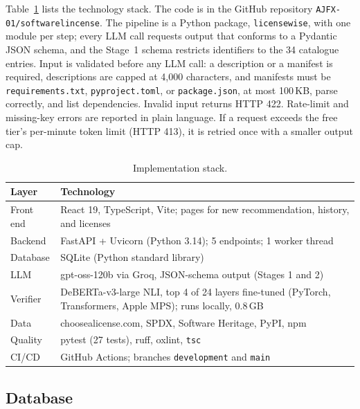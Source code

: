 Table~\ref{tab:impl} lists the technology stack. The code is in the GitHub repository \texttt{AJFX-01/softwarelincense}. The pipeline is a Python package, \texttt{licensewise}, with one module per step; every LLM call requests output that conforms to a Pydantic JSON schema, and the Stage~1 schema restricts identifiers to the 34 catalogue entries. Input is validated before any LLM call: a description or a manifest is required, descriptions are capped at 4{,}000 characters, and manifests must be \texttt{requirements.txt}, \texttt{pyproject.toml}, or \texttt{package.json}, at most 100\,KB, parse correctly, and list dependencies. Invalid input returns HTTP 422. Rate-limit and missing-key errors are reported in plain language. If a request exceeds the free tier's per-minute token limit (HTTP 413), it is retried once with a smaller output cap.

\begin{table}[tb]
    \caption{Implementation stack.}
    \label{tab:impl}
    \centering
    \footnotesize
    \begin{tabularx}{\columnwidth}{@{}lX@{}}
        \toprule
        \textbf{Layer} & \textbf{Technology} \\
        \midrule
        Front end & React 19, TypeScript, Vite; pages for new recommendation, history, and licenses \\
        Backend & FastAPI + Uvicorn (Python 3.14); 5 endpoints; 1 worker thread \\
        Database & SQLite (Python standard library) \\
        LLM & gpt-oss-120b via Groq, JSON-schema output (Stages 1 and 2) \\
        Verifier & DeBERTa-v3-large NLI, top 4 of 24 layers fine-tuned (PyTorch, Transformers, Apple MPS); runs locally, 0.8\,GB \\
        Data & choosealicense.com, SPDX, Software Heritage, PyPI, npm \\
        Quality & pytest (27 tests), ruff, oxlint, \texttt{tsc} \\
        CI/CD & GitHub Actions; branches \texttt{development} and \texttt{main} \\
        \bottomrule
    \end{tabularx}
\end{table}

\subsection{Database}
\label{ss:db}

